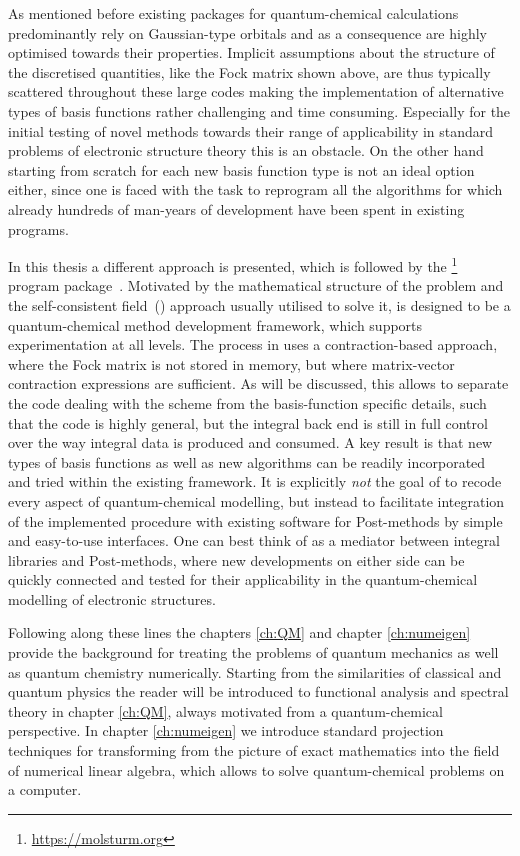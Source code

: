As mentioned before existing packages for quantum-chemical calculations
predominantly rely on Gaussian-type orbitals
and as a consequence are highly optimised towards their properties.
Implicit assumptions
about the structure of the discretised quantities,
like the Fock matrix shown above,
are thus typically scattered throughout these large codes
making the implementation of alternative types of basis functions
rather challenging and time consuming.
Especially for the initial testing of novel methods
towards their range of applicability
in standard problems of electronic structure theory
this is an obstacle.
On the other hand starting from scratch for each new basis function type
is not an ideal option either,
since one is faced with the task to reprogram all the algorithms for which
already hundreds of man-years of development have been spent in existing programs.

In this thesis a different approach is presented,
which is followed by the \molsturm%
\footnote{\url{https://molsturm.org}}
program package~\cite{molsturmWeb}.
Motivated by the mathematical structure of the \HF problem
and the self-consistent field~(\SCF) approach usually utilised
to solve it, \molsturm is designed
to be a quantum-chemical method development framework,
which supports experimentation at all levels.
The \SCF process in \molsturm uses a contraction-based approach,
where the Fock matrix is not stored in memory,
but where matrix-vector contraction expressions are sufficient.
As will be discussed, this allows to separate the code dealing with the \SCF scheme
from the basis-function specific details,
such that the \SCF code is highly general,
but the integral back end is still in full control
over the way integral data is produced and consumed.
A key result is that new types of basis functions
as well as new \SCF algorithms can be readily incorporated
and tried within the existing framework.
It is explicitly \emph{not} the goal of \molsturm to recode
every aspect of quantum-chemical modelling,
but instead to facilitate integration
of the implemented \SCF procedure
with existing software for Post-\HF methods
by simple and easy-to-use interfaces.
One can best think of \molsturm as a mediator
between integral libraries and Post-\HF methods,
where new developments on either side
can be quickly connected and tested for their applicability
in the quantum-chemical modelling of electronic structures.

Following along these lines the chapters
\ref{ch:QM} and chapter \ref{ch:numeigen}
provide the background for treating the problems of quantum mechanics
as well as quantum chemistry numerically.
Starting from the similarities of classical and quantum physics
the reader will be introduced to functional analysis
and spectral theory in chapter \ref{ch:QM},
always motivated from a quantum-chemical perspective.
In chapter \ref{ch:numeigen} we introduce standard projection techniques
for transforming from the picture of exact mathematics
into the field of numerical linear algebra,
which allows to solve quantum-chemical problems on a computer.

